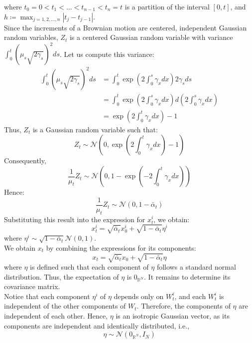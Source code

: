\documentclass[a4paper,10pt]{article}
\begin{document}
where $t_0 = 0 < t_1 < \dots < t_{n-1} < t_n = t$ is a partition of the interval $[0, t]$, and $h \coloneqq \max_{j=1,2,\dots,n} |t_j - t_{j-1}|$.
\\Since the increments of a Brownian motion are centered, independent Gaussian random variables, $Z_t$ is a centered Gaussian random variable with variance $\int_0^t (\mu_s \sqrt{2\gamma_s})^2 ds$. Let us compute this variance:
\begin{align*}
\int_0^t (\mu_s \sqrt{2\gamma_s})^2 ds &= \int_0^t \exp\left(2 \int_0^s \gamma_x dx\right) 2 \gamma_s ds \\
&= \int_0^t \exp\left(2 \int_0^s \gamma_x dx\right) d\left(2 \int_0^s \gamma_x dx\right) \\
&= \exp\left(2 \int_0^t \gamma_x dx\right) - 1
\end{align*}
Thus, $Z_t$ is a Gaussian random variable such that:
\begin{equation*}
Z_t \sim \mathcal{N}\left(0, \exp\left(2 \int_0^t \gamma_x dx\right) - 1\right)
\end{equation*}
Consequently,
\begin{equation*}
\frac{1}{\mu_t} Z_t \sim \mathcal{N}\left(0, 1 - \exp\left(-2 \int_0^t \gamma_x dx\right)\right)
\end{equation*}
Hence:
\begin{equation*}
\frac{1}{\mu_t} Z_t \sim \mathcal{N}\left(0, 1 - \bar{\alpha}_t\right)
\end{equation*}
Substituting this result into the expression for $x_t^i$, we obtain:
\begin{equation*}
x_t^i = \sqrt{\bar{\alpha}_t} x_0^i + \sqrt{1 - \bar{\alpha}_t} \eta^i
\end{equation*}
where $\eta^i \sim \sqrt{1 - \bar{\alpha}_t} \mathcal{N}(0, 1)$.
\\We obtain $x_t$ by combining the expressions for its components:
\begin{equation*}
x_t = \sqrt{\bar{\alpha}_t} x_0 + \sqrt{1 - \bar{\alpha}_t} \eta
\end{equation*}
where $\eta$ is defined such that each component of $\eta$ follows a standard normal distribution. Thus, the expectation of $\eta$ is $0_{\mathbb{R}^N}$. It remains to determine its covariance matrix.
\\Notice that each component $\eta^i$ of $\eta$ depends only on $W_t^i$, and each $W_t^i$ is independent of the other components of $W_t$. Therefore, the components of $\eta$ are independent of each other. Hence, $\eta$ is an isotropic Gaussian vector, as its components are independent and identically distributed, i.e.,
\begin{equation*}
\eta \sim \mathcal{N}(0_{\mathbb{R}^N}, I_N)
\end{equation*}
\end{document}
